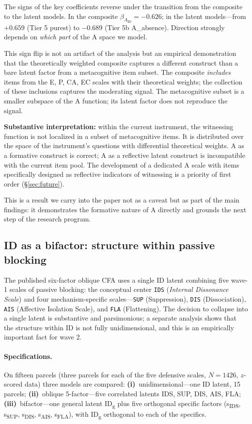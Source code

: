The signs of the key coefficients reverse under the transition from the composite to the latent models. In the composite $\beta_{A_{\text{ID}}} = -0.626$; in the latent models---from $+0.659$ (Tier 5 purest) to $-0.689$ (Tier 5b A\_absence). Direction strongly depends on \emph{which part} of the A space we model.

This sign flip is not an artifact of the analysis but an empirical demonstration that the theoretically weighted composite captures a different construct than a bare latent factor from a metacognitive item subset. The composite \emph{includes} items from the E, P, CA, EC scales with their theoretical weights; the collection of these inclusions captures the moderating signal. The metacognitive subset is a smaller subspace of the A function; its latent factor does not reproduce the signal.

\textbf{Substantive interpretation:} within the current instrument, the witnessing function is not localized in a subset of metacognitive items. It is distributed over the space of the instrument's questions with differential theoretical weights. A as a formative construct is correct; A as a reflective latent construct is incompatible with the current item pool. The development of a dedicated A scale with items specifically designed as reflective indicators of witnessing is a priority of first order (§\ref{sec:future}).

This is a result we carry into the paper not as a caveat but as part of the main findings: it demonstrates the formative nature of A directly and grounds the next step of the research program.

\subsection{ID as a bifactor: structure within passive blocking}
\label{subsec:id_bifactor}

The published six-factor oblique CFA uses a single ID latent combining five wave-1 scales of passive blocking: the conceptual center \texttt{IDS} (\emph{Internal Dissonance Scale}) and four mechanism-specific scales---\texttt{SUP} (Suppression), \texttt{DIS} (Dissociation), \texttt{AIS} (Affective Isolation Scale), and \texttt{FLA} (Flattening). The decision to collapse into a single latent is substantive and parsimonious; a separate analysis shows that the structure within ID is not fully unidimensional, and this is an empirically important fact for wave 2.

\paragraph{Specifications.} On fifteen parcels (three parcels for each of the five defensive scales, $N = 1426$, $z$-scored data) three models are compared: \textbf{(i)}~unidimensional---one ID latent, 15 parcels; \textbf{(ii)}~oblique 5-factor---five correlated latents IDS, SUP, DIS, AIS, FLA; \textbf{(iii)}~bifactor---one general latent ID\textsubscript{g} plus five orthogonal specific factors (s\textsubscript{IDS}, s\textsubscript{SUP}, s\textsubscript{DIS}, s\textsubscript{AIS}, s\textsubscript{FLA}), with ID\textsubscript{g} orthogonal to each of the specifics.

